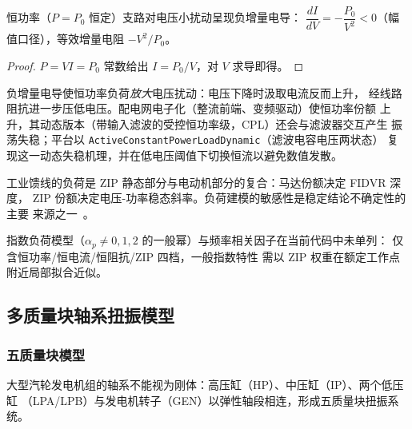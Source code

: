\begin{proposition}[恒功率负荷的负增量特性]\label{sec:dy-th-ctl-prop-cpl}
恒功率（$P=P_0$ 恒定）支路对电压小扰动呈现负增量电导：
$\dfrac{dI}{dV}=-\dfrac{P_0}{V^2}<0$（幅值口径），等效增量电阻 $-V^2/P_0$。
\end{proposition}

\begin{proof}
$P=VI=P_0$ 常数给出 $I=P_0/V$，对 $V$ 求导即得。
\end{proof}

\begin{remark}
负增量电导使恒功率负荷\emph{放大}电压扰动：电压下降时汲取电流反而上升，
经线路阻抗进一步压低电压。配电网电子化（整流前端、变频驱动）使恒功率份额
上升，其动态版本（带输入滤波的受控恒功率级，CPL）还会与滤波器交互产生
振荡失稳；平台以 \texttt{ActiveConstantPowerLoadDynamic}（滤波电容电压两状态）
复现这一动态失稳机理，并在低电压阈值下切换恒流以避免数值发散。
\end{remark}

\begin{remark}[复合负荷]
工业馈线的负荷是 ZIP 静态部分与电动机部分的复合：马达份额决定 FIDVR 深度，
ZIP 份额决定电压-功率稳态斜率。负荷建模的敏感性是稳定结论不确定性的主要
来源之一~\cite{ctl:load-tf,ctl:taylor}。
\end{remark}

\begin{gapnote}
指数负荷模型（$\alpha_p\neq0,1,2$ 的一般幂）与频率相关因子在当前代码中未单列：
 仅含恒功率/恒电流/恒阻抗/ZIP 四档，一般指数特性
需以 ZIP 权重在额定工作点附近局部拟合近似。
\end{gapnote}

\subsection{多质量块轴系扭振模型}\label{sec:dy-th-ctl-shaft}

\subsubsection{五质量块模型}

大型汽轮发电机组的轴系不能视为刚体：高压缸（HP）、中压缸（IP）、两个低压缸
（LPA/LPB）与发电机转子（GEN）以弹性轴段相连，形成五质量块扭振系统。

